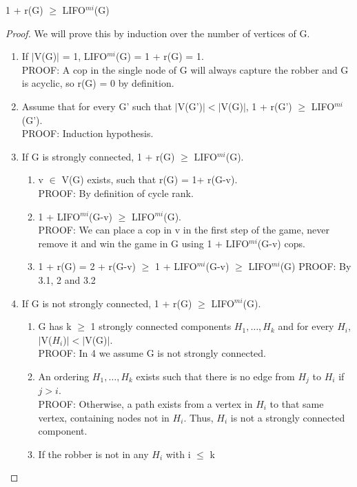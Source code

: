 \begin{lemma}
1 + r(G) $\geq$ LIFO$^{mi}$(G)
\end{lemma}
\begin{proof}
We will prove this by induction over the number of vertices of G.
\begin{enumerate}
  \item If $|$V(G)$|$ = 1, LIFO$^{mi}$(G) = 1 + r(G) = 1. \\
  PROOF: A cop in the single node of G will always capture the robber and G is acyclic, so r(G) = 0 by definition.
  \item Assume that for every G' such that  $|$V(G')$| < |$V(G)$|$, 1 + r(G') $\geq$ LIFO$^{mi}$(G'). \\
  PROOF: Induction hypothesis.
  \item If G is strongly connected, 1 + r(G) $\geq$ LIFO$^{mi}$(G).
  \begin{enumerate}[label*=\arabic*.]
    \item v $\in$ V(G) exists, such that r(G) = 1+ r(G-v). \\
    PROOF: By definition of cycle rank.
    \item 1 + LIFO$^{mi}$(G-v) $\geq$ LIFO$^{mi}$(G). \\
    PROOF: We can place a cop in v in the first step of the game, never remove it and win the game in G using 1 + LIFO$^{mi}$(G-v) cops.
    \item  1 + r(G) = 2 + r(G-v) $\geq$ 1 + LIFO$^{mi}$(G-v) $\geq$ LIFO$^{mi}$(G)
    PROOF: By 3.1, 2 and 3.2
  \end{enumerate}
  \item If G is not strongly connected, 1 + r(G) $\geq$ LIFO$^{mi}$(G).
  \begin{enumerate}[label*=\arabic*.]
    \item G has k $\geq$ 1 strongly connected components $H_1, \ldots, H_k$ and for every $H_i$, $|$V($H_i$)$| < |$V(G)$|$. \\
    PROOF: In 4 we assume G is not strongly connected.
    \item An ordering $H_1, \ldots, H_k$ exists such that there is no edge from $H_j$ to $H_i$ if $j > i$. \\
    PROOF: Otherwise, a path exists from a vertex in $H_i$ to that same vertex, containing nodes not in $H_i$. Thus, $H_i$ is not a strongly connected component. 
    \item If the robber is not in any $H_i$ with i $\leq$ k
  \end{enumerate}
\end{enumerate}
\end{proof}